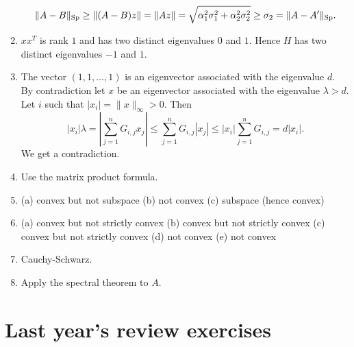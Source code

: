 \documentclass[11pt,nocut]{article}
\begin{document}
\begin{enumerate}
		$$
		\|A-B\|_{\rm Sp} \geq \|(A-B)z\| = \|Az\| = \sqrt{\alpha_1^2 \sigma_1^2 + \alpha_2^2 \sigma_2^2} \geq \sigma_2 =  \|A-A'\|_{\rm Sp}.
		$$
	\item $xx^T$ is rank $1$ and has two distinct eigenvalues $0$ and $1$. Hence $H$ has two distinct eigenvalues $-1$ and $1$.
	\item The vector $(1,1, \dots,1)$ is an eigenvector associated with the eigenvalue $d$. By contradiction let $x$ be an eigenvector associated with the eigenvalue $\lambda >d$. Let $i$ such that $|x_i| = \|x\|_{\infty} >0$. Then
		$$
		|x_i| \lambda 
		= |\sum_{j=1}^n G_{i,j} x_j|
		\leq \sum_{j=1}^n G_{i,j} |x_j|
		\leq |x_i| \sum_{j=1}^n G_{i,j} = d |x_i|.
		$$
		We get a contradiction.
	\item Use the matrix product formula.
	\item (a) convex but not subspace (b) not convex (c) subspace (hence convex)
	\item (a) convex but not strictly convex (b) convex but not strictly convex (c) convex but not strictly convex (d) not convex (e) not convex
	\item Cauchy-Schwarz.
	\item Apply the spectral theorem to $A$.
\end{enumerate}

\section{Last year's review exercises}
\end{document}
